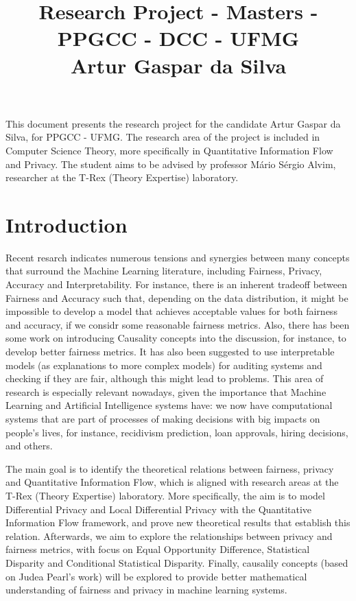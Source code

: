\documentclass[12pt]{article}
\title{\Huge Research Project - Masters - PPGCC - DCC - UFMG\large\\Artur Gaspar da Silva}
\date{}
\begin{document}
\maketitle
\vspace{-8em}

This document presents the research project for the candidate Artur Gaspar da Silva, for PPGCC - UFMG. The research area of the project is included in Computer Science Theory, more specifically in Quantitative Information Flow and Privacy. The student aims to be advised by professor Mário Sérgio Alvim, researcher at the T-Rex (Theory Expertise) laboratory.

\section{Introduction}

Recent resarch\cite{Sok}\cite{Reductions}\cite{Rachel}\cite{Awareness} indicates numerous tensions and synergies between many concepts that surround the Machine Learning literature, including Fairness, Privacy, Accuracy and Interpretability. For instance, there is an inherent tradeoff between Fairness and Accuracy such that, depending on the data distribution, it might be impossible to develop a model that achieves acceptable values for both fairness and accuracy, if we considr some reasonable fairness metrics\cite{Carlos}. Also, there has been some work on introducing Causality concepts into the discussion, for instance, to develop better fairness metrics\cite{CausalFair}. It has also been suggested to use interpretable models (as explanations to more complex models) for auditing systems and checking if they are fair, although this might lead to problems\cite{ExplainAll}. This area of research is especially relevant nowadays, given the importance that Machine Learning and Artificial Intelligence systems have: we now have computational systems that are part of processes of making decisions with big impacts on people's lives, for instance, recidivism prediction\cite{Compass}, loan approvals\cite{Loans}, hiring decisions\cite{Jobs}, and others.

The main goal is to identify the theoretical relations between fairness, privacy and Quantitative Information Flow, which is aligned with research areas at the T-Rex (Theory Expertise) laboratory. More specifically, the aim is to model Differential Privacy and Local Differential Privacy with the Quantitative Information Flow framework, and prove new theoretical results that establish this relation. Afterwards, we aim to explore the relationships between privacy and fairness metrics, with focus on Equal Opportunity Difference, Statistical Disparity and Conditional Statistical Disparity. Finally, causalily concepts (based on Judea Pearl's work\cite{Causality}) will be explored to provide better mathematical understanding of fairness and privacy in machine learning systems.
\end{document}

